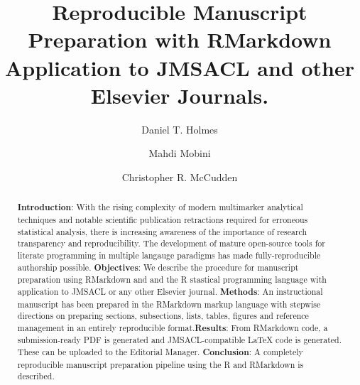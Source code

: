 \documentclass[]{elsarticle} %
\begin{document}
\begin{frontmatter}

  \title{Reproducible Manuscript Preparation with RMarkdown
\newline \large Application to JMSACL and other Elsevier Journals.}
    \author[SPH,UBC]{Daniel T. Holmes}
    \author[SPH,PHCDP]{Mahdi Mobini}
    \author[UO,TOH,EORLA]{Christopher R. McCudden}
      \address[SPH]{St.~Paul's Hospital Department of Pathology and
Laboratory Medicine, 1081 Burrard St., Vancouver, BC V6Z 1Y6 Canada}
    \address[PHCDP]{Providence Health Digital Products, 1190 Hornby St.,
Vancouver, BC V6Z 2K5 Canada}
    \address[UBC]{University of British Columbia Department of Pathology
and Laboratory Medicine, 2211 Wesbrook Mall, Vancouver, BC V6T 1Z7
Canada}
    \address[TOH]{Department of Pathology and Laboratory Medicine,
Ottawa Hospital, General Campus, 501 Smyth Road, Ottawa, ON K1H 8L6
Canada}
    \address[UO]{Department of Pathology and Laboratory Medicine,
University of Ottawa}
    \address[EORLA]{Eastern Ontario Regional Laboratory Association}
  
  \begin{abstract}
  \textbf{Introduction}: With the rising complexity of modern
  multimarker analytical techniques and notable scientific publication
  retractions required for erroneous statistical analysis, there is
  increasing awareness of the importance of research transparency and
  reproducibility. The development of mature open-source tools for
  literate programming in multiple langauge paradigms has made
  fully-reproducible authorship possible. \newline \textbf{Objectives}:
  We describe the procedure for manuscript preparation using RMarkdown
  and and the R stastical programming language with application to
  JMSACL or any other Elsevier journal. \newline \textbf{Methods}: An
  instructional manuscript has been prepared in the RMarkdown markup
  language with stepwise directions on preparing sections, subsections,
  lists, tables, figures and reference management in an entirely
  reproducible format.\newline \textbf{Results}: From RMarkdown code, a
  submission-ready PDF is generated and JMSACL-compatible LaTeX code is
  generated. These can be uploaded to the Editorial Manager.\newline
  \textbf{Conclusion}: A completely reproducible manuscript preparation
  pipeline using the R and RMarkdown is described.\newline
  \end{abstract}
  
 \end{frontmatter}
\end{document}

